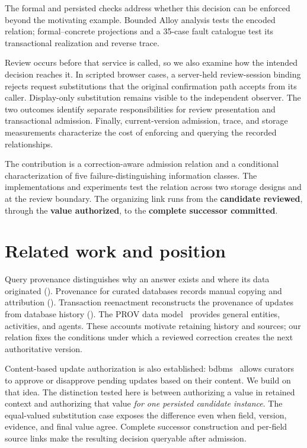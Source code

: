 \documentclass[preprint,12pt,authoryear]{elsarticle}
\begin{document}
The formal and persisted checks address whether this decision can be enforced beyond the motivating example. Bounded Alloy analysis tests the encoded relation; formal–concrete projections and a 35-case fault catalogue test its transactional realization and reverse trace.

Review occurs before that service is called, so we also examine how the intended decision reaches it. In scripted browser cases, a server-held review-session binding rejects request substitutions that the original confirmation path accepts from its caller. Display-only substitution remains visible to the independent observer. The two outcomes identify separate responsibilities for review presentation and transactional admission. Finally, current-version admission, trace, and storage measurements characterize the cost of enforcing and querying the recorded relationships.

The contribution is a correction-aware admission relation and a conditional characterization of five failure-distinguishing information classes. The implementations and experiments test the relation across two storage designs and at the review boundary. The organizing link runs from the \textbf{candidate reviewed}, through the \textbf{value authorized}, to the \textbf{complete successor committed}.

\section{Related work and position}

Query provenance distinguishes why an answer exists and where its data originated (\citet{buneman2001why}). Provenance for curated databases records manual copying and attribution (\citet{buneman2006curated}). Transaction reenactment reconstructs the provenance of updates from database history (\citet{arab2018reenactment}). The PROV data model~\citep{w3c2013prov} provides general entities, activities, and agents. These accounts motivate retaining history and sources; our relation fixes the conditions under which a reviewed correction creates the next authoritative version.

Content-based update authorization is also established: bdbms~\citep{eltabakh2006bdbms} allows curators to approve or disapprove pending updates based on their content. We build on that idea. The distinction tested here is between authorizing a value in retained context and authorizing that value \emph{for one persisted candidate instance}. The equal-valued substitution case exposes the difference even when field, version, evidence, and final value agree. Complete successor construction and per-field source links make the resulting decision queryable after admission.
\end{document}
